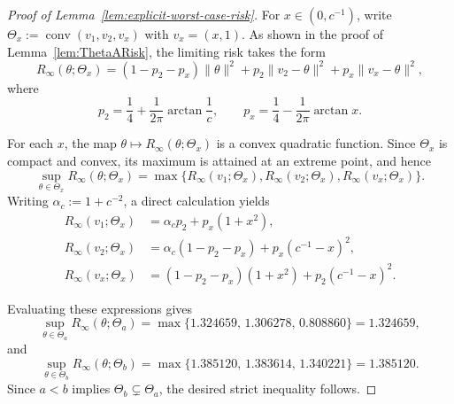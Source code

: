 \documentclass[11pt]{article}
\theoremstyle{plain}
\theoremstyle{definition}
\begin{document}
\begin{proof}[Proof of Lemma~\ref{lem:explicit-worst-case-risk}]
For $x\in(0,c^{-1})$, write $\Theta_x:=\operatorname{conv} (v_1,v_2,v_x)$ with $v_x=(x,1)$.
As shown in the proof of Lemma~\ref{lem:ThetaARisk}, the limiting risk takes the form
\[
R_\infty(\theta;\Theta_x)
=
(1-p_2-p_x)
\|\theta\|^2
+
p_2\|v_2-\theta\|^2
+
p_x\|v_x-\theta\|^2,
\]
where
\[
p_2=\frac14+\frac{1}{2\pi}\arctan \frac1c ,
\qquad
p_x=\frac14-\frac{1}{2\pi}\arctan x.
\]

For each $x$, the map $\theta\mapsto R_\infty(\theta;\Theta_x)$ is a convex quadratic function.
Since $\Theta_x$ is compact and convex, its maximum is attained at an extreme point, and hence
\[
\sup_{\theta\in\Theta_x} R_\infty(\theta;\Theta_x)
=
\max\{
R_\infty(v_1;\Theta_x),
R_\infty(v_2;\Theta_x),
R_\infty(v_x;\Theta_x)
\}.
\]
Writing $\alpha_c:=1+c^{-2}$, a direct calculation yields
\begin{align*}
R_\infty(v_1;\Theta_x)
&=\alpha_c p_2+p_x(1+x^2),\\
R_\infty(v_2;\Theta_x)
&=\alpha_c (1-p_2-p_x) +p_x(c^{-1}-x)^2,\\
R_\infty(v_x;\Theta_x)
&=(1-p_2-p_x)(1+x^2)+p_2(c^{-1}-x)^2.
\end{align*}

Evaluating these expressions gives
\[
\sup_{\theta\in\Theta_a} R_\infty(\theta;\Theta_a)
=
\max\{1.324659,\,1.306278,\,0.808860\}
=
1.324659,
\]
and
\[
\sup_{\theta\in\Theta_b} R_\infty(\theta;\Theta_b)
=
\max\{1.385120,\,1.383614,\,1.340221\}
=
1.385120.
\]
Since $a<b$ implies $\Theta_b \subsetneq \Theta_a$, the desired strict inequality follows.
\end{proof}
\end{document}
